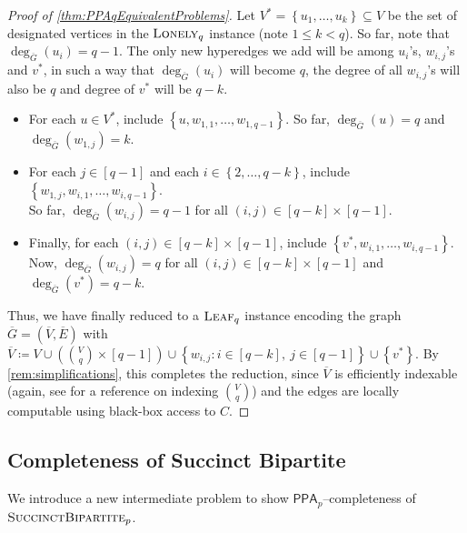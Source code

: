 \documentclass[10pt,a4paper]{article}
\theoremstyle{definition}
\theoremstyle{remark}
\newcommand{\inparen}[1]{\left ( #1 \right )}
\def\set#1{\left\{#1\right\}}
\newcommand{\class}[1]{\ensuremath{\mathsf{#1}}\xspace}
\newcommand{\PPA}{\class{PPA}}
\newcommand{\leaf}{\ensuremath\textsc{Leaf}}
\newcommand{\lonely}{\ensuremath\textsc{Lonely}}
\newcommand{\sucBipartite}{\ensuremath{\textsc{SuccinctBipartite}}}
\begin{document}
\begin{proof}[Proof of \autoref{thm:PPAqEquivalentProblems}]
Let $V^* = \set{u_1, \ldots, u_k} \subseteq V$ be the set of designated vertices in the $\lonely_q$ instance (note $1 \le k < q$). So far, note that $\deg_{\overline{G}}(u_i) = q-1$. The only new hyperedges we add will be among $u_i$'s, $w_{i,j}$'s and $v^*$, in such a way that $\deg_{\overline{G}}(u_i)$ will become $q$, the degree of all $w_{i,j}$'s will also be $q$ and degree of $v^*$ will be $q-k$.
\begin{itemize}[label=$\triangleright$, itemsep=3pt]
\item For each $u \in V^*$, include $\set{u, w_{1,1}, \ldots, w_{1,q-1}}$. So far, $\deg_{\overline{G}}(u) = q$ and $\deg_{\overline{G}}(w_{1,j}) = k$.
\item For each $j \in [q-1]$ and each $i \in \set{2, \ldots, q-k}$, include $\set{w_{1,j}, w_{i,1}, \ldots, w_{i,q-1}}$.\\
So far, $\deg_{\overline{G}}(w_{i,j}) = q-1$ for all $(i,j) \in [q-k] \times [q-1]$.
\item Finally, for each $(i,j) \in [q-k] \times [q-1]$, include $\set{v^*, w_{i,1}, \ldots, w_{i,q-1}}$.\\
Now, $\deg_{\overline{G}}(w_{i,j}) = q$ for all $(i,j) \in [q-k] \times [q-1]$ and $\deg_{\overline{G}}(v^*) = q-k$.
\end{itemize}

Thus, we have finally reduced to a $\leaf_q$ instance encoding the graph $\overline{G} = (\overline{V}, \overline{E})$ with $\overline{V} \coloneqq V \cup  \inparen{\binom{V}{q} \times [q-1]} \cup \set{w_{i,j} : i \in [q-k],\ j \in [q-1]} \cup \set{v^*}$. By \autoref{rem:simplifications}, this completes the reduction, since $\overline{V}$ is efficiently indexable (again, see \cite{r31} for a reference on indexing $\binom{V}{q}$) and the edges are locally computable using black-box access to $C$.
\end{proof}

\subsection{\boldmath Completeness of Succinct Bipartite}\label{sec:sucBipartite}


We introduce a new intermediate problem to show $\PPA_p$--completeness of $\sucBipartite_p$.\\[1mm]
\end{document}
